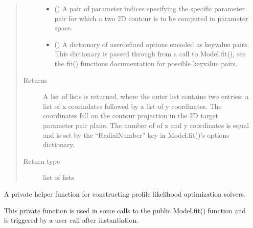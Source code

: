 \documentclass[letterpaper,10pt,english,openany,oneside]{sphinxmanual}
\begin{document}
\begin{fulllineitems}
\begin{fulllineitems}
\begin{quote}
\begin{description}
\begin{itemize}
\item {} 
 (\sphinxstyleliteralemphasis{\sphinxupquote{, }}) \textendash{} A pair of parameter indices specifying the specific
parameter pair for which a two 2D contour is to be computed in parameter space.

\item {} 
 () \textendash{} A dictionary of user\sphinxhyphen{}defined options encoded as key\sphinxhyphen{}value
pairs. This dictionary is passed through from a call to Model.fit(), see
the fit() functions documentation for possible key\sphinxhyphen{}value pairs.

\end{itemize}

\item[{Returns}] \leavevmode
A list of lists is returned, where the outer list contains two entries;
a list of x coorindates followed by a list of y coordinates. The coordinates fall on
the contour projection in the 2D target parameter pair plane. The number of of x and y
coordinates is equal and is set by the “RadialNumber” key in Model.fit()’s options
dictionary.

\item[{Return type}] \leavevmode
list of lists

\end{description}\end{quote}

\end{fulllineitems}


\begin{fulllineitems}
\label{\detokenize{nloed:nloed.model.Model.__profile_setup}}
A private helper function for constructing profile likelihood optimization solvers.

This private function is used in some calls to the public Model.fit() function and is
triggered by a user call after instantiation.


\end{fulllineitems}
\end{fulllineitems}
\end{document}

